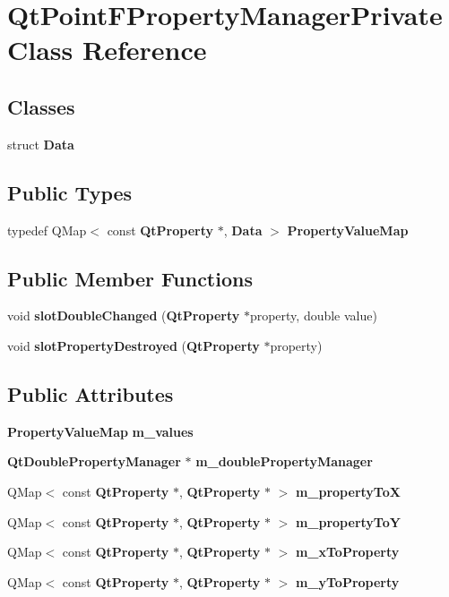 \section{Qt\+Point\+F\+Property\+Manager\+Private Class Reference}
\label{classQtPointFPropertyManagerPrivate}
\subsection*{Classes}
\begin{DoxyCompactItemize}
\item 
struct {\bf Data}
\end{DoxyCompactItemize}
\subsection*{Public Types}
\begin{DoxyCompactItemize}
\item 
typedef Q\+Map$<$ const {\bf Qt\+Property} $\ast$, {\bf Data} $>$ {\bf Property\+Value\+Map}
\end{DoxyCompactItemize}
\subsection*{Public Member Functions}
\begin{DoxyCompactItemize}
\item 
void {\bf slot\+Double\+Changed} ({\bf Qt\+Property} $\ast$property, double value)
\item 
void {\bf slot\+Property\+Destroyed} ({\bf Qt\+Property} $\ast$property)
\end{DoxyCompactItemize}
\subsection*{Public Attributes}
\begin{DoxyCompactItemize}
\item 
{\bf Property\+Value\+Map} {\bf m\+\_\+values}
\item 
{\bf Qt\+Double\+Property\+Manager} $\ast$ {\bf m\+\_\+double\+Property\+Manager}
\item 
Q\+Map$<$ const {\bf Qt\+Property} $\ast$, {\bf Qt\+Property} $\ast$ $>$ {\bf m\+\_\+property\+ToX}
\item 
Q\+Map$<$ const {\bf Qt\+Property} $\ast$, {\bf Qt\+Property} $\ast$ $>$ {\bf m\+\_\+property\+ToY}
\item 
Q\+Map$<$ const {\bf Qt\+Property} $\ast$, {\bf Qt\+Property} $\ast$ $>$ {\bf m\+\_\+x\+To\+Property}
\item 
Q\+Map$<$ const {\bf Qt\+Property} $\ast$, {\bf Qt\+Property} $\ast$ $>$ {\bf m\+\_\+y\+To\+Property}
\end{DoxyCompactItemize}


